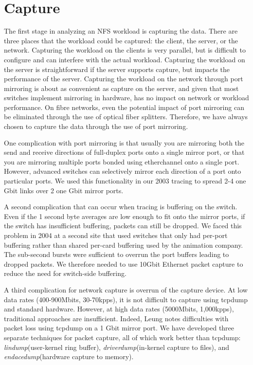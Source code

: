 \section{Capture}
\label{sec:capture}


The first stage in analyzing an NFS workload is capturing the data.
There are three places that the workload could be captured: the
client, the server, or the network.  Capturing the workload on the
clients is very parallel, but is difficult to configure and can
interfere with the actual workload.  Capturing the workload on the
server is straightforward if the server supports capture, 
but impacts the performance of the
server.  Capturing the workload on the network through port mirroring
is about as convenient as capture on the server, and given that most
switches implement mirroring in hardware, has no impact on network or
workload performance.  On fibre networks, even the potential impact of
port mirroring can be eliminated through the use of optical fiber
splitters. Therefore, we have always chosen to capture the
data through the use of port mirroring.

One complication with port mirroring is that usually you are mirroring
both the send and receive directions of full-duplex ports onto a
single mirror port, or that you are mirroring multiple ports bonded
using etherchannel onto a single port. However, advanced switches can
selectively mirror each direction of a port onto particular ports.  We
used this functionality in our 2003 tracing to spread 2-4 one Gbit
links over 2 one Gbit mirror ports.

A second complication that can occur when tracing is buffering on the
switch.  Even if the 1 second byte averages are low enough to fit onto
the mirror ports, if the switch has insufficient buffering, packets
can still be dropped.  We faced this problem in 2004 at a second
site that used switches that only had per-port buffering rather
than shared per-card buffering used by the animation company.  The
sub-second bursts were sufficient to overrun the port buffers leading
to dropped packets.  We therefore needed to use 10Gbit Ethernet packet
capture to reduce the need for switch-side buffering.

A third complication for network capture is overrun of the capture
device.  At low data rates (400-900Mbits, 30-70kpps), it is not
difficult to capture using tcpdump and standard hardware.  However, at
high data rates (5000Mbits, 1,000kpps), traditional approaches are
insufficient. Indeed, Leung\cite{LeungUsenix08} notes 
difficulties with packet loss using tcpdump on a 1 Gbit mirror port.
We have developed three separate techniques for packet capture, all of
which work better than tcpdump: {\it lindump}(user-kernel ring
buffer), {\it driverdump}(in-kernel capture to files), and {\it
endacedump}(hardware capture to memory).

